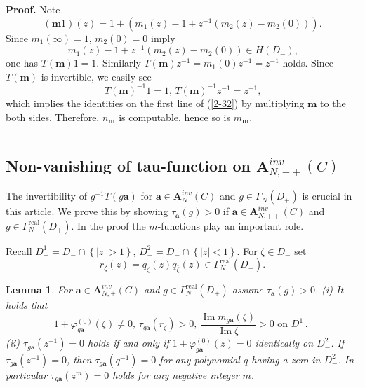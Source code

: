 \documentclass[a4paper]{article}%
\newtheorem{lemma}{Lemma}
\newenvironment{proof}[1][Proof]{\noindent\textbf{#1.} }{\ \rule{0.5em}{0.5em}}
\begin{document}
\begin{proof}
Note%
\[
\left(  \boldsymbol{m}1\right)  \left(  z\right)  =1+\left(  m_{1}\left(
z\right)  -1+z^{-1}\left(  m_{2}\left(  z\right)  -m_{2}\left(  0\right)
\right)  \right)  \text{.}%
\]
Since $m_{1}(\infty)=1$, $m_{2}(0)=0$ imply%
\[
m_{1}\left(  z\right)  -1+z^{-1}\left(  m_{2}\left(  z\right)  -m_{2}\left(
0\right)  \right)  \in H\left(  D_{-}\right)  \text{,}%
\]
one has $T\left(  \boldsymbol{m}\right)  1=1$. Similarly $T\left(
\boldsymbol{m}\right)  z^{-1}=m_{1}\left(  0\right)  z^{-1}=z^{-1}$ holds.
Since $T\left(  \boldsymbol{m}\right)  $ is invertible, we easily see%
\[
T\left(  \boldsymbol{m}\right)  ^{-1}1=1\text{, \ \ }T\left(  \boldsymbol{m}%
\right)  ^{-1}z^{-1}=z^{-1}\text{,}%
\]
which implies the identities on the first line of (\ref{2-32}) by multiplying
$\boldsymbol{m}$ to the both sides. Therefore, $n_{\boldsymbol{m}}$ is
computable, hence so is $m_{\boldsymbol{m}}$.
\end{proof}

\subsection{Non-vanishing of tau-function on $\boldsymbol{A}_{N,++}%
^{inv}\left(  C\right)  $}

The invertibility of $g^{-1}T\left(  g\boldsymbol{a}\right)  $ for
$\boldsymbol{a}\in\boldsymbol{A}_{N}^{inv}\left(  C\right)  $ and $g\in
\Gamma_{N}\left(  D_{+}\right)  $ is crucial in this article. We prove this by
showing $\tau_{\boldsymbol{a}}\left(  g\right)  >0$ if $\boldsymbol{a}%
\in\boldsymbol{A}_{N,++}^{inv}\left(  C\right)  $ and $g\in\Gamma
_{N}^{\operatorname{real}}\left(  D_{+}\right)  $. In the proof the
$m$-functions play an important role.

Recall $D_{-}^{1}=D_{-}\cap\left\{  \left\vert z\right\vert >1\right\}  $,
$D_{-}^{2}=D_{-}\cap\left\{  \left\vert z\right\vert <1\right\}  $. For
$\zeta\in D_{-}$ set
\[
r_{\zeta}\left(  z\right)  =q_{\zeta}\left(  z\right)  q_{\overline{\zeta}%
}\left(  z\right)  \in\Gamma_{N}^{\operatorname{real}}\left(  D_{+}\right)
\text{.}%
\]


\begin{lemma}
\label{l2-14}For $\boldsymbol{a}\in\boldsymbol{A}_{N,+}^{inv}\left(  C\right)
$ and $g\in\Gamma_{N}^{\operatorname{real}}\left(  D_{+}\right)  $ assume
$\tau_{\boldsymbol{a}}\left(  g\right)  >0$. \newline(i) It holds that%
\[
1+\varphi_{g\boldsymbol{a}}^{\left(  0\right)  }\left(  \zeta\right)
\neq0\text{, \ }\tau_{g\boldsymbol{a}}\left(  r_{\zeta}\right)  >0\text{,\ \ }%
\dfrac{\operatorname{Im}m_{g\boldsymbol{a}}\left(  \zeta\right)
}{\operatorname{Im}\zeta}>0\text{\ on }D_{-}^{1}\text{.\ }%
\]
\newline(ii) $\tau_{g\boldsymbol{a}}\left(  z^{-1}\right)  =0$ holds if and
only if $1+\varphi_{g\boldsymbol{a}}^{\left(  0\right)  }\left(  z\right)  =0$
identically on $D_{-}^{2}$. If $\tau_{g\boldsymbol{a}}\left(  z^{-1}\right)
=0$, then $\tau_{g\boldsymbol{a}}\left(  q^{-1}\right)  =0$ for any polynomial
$q$ having a zero in $D_{-}^{2}$. In particular $\tau_{g\boldsymbol{a}}\left(
z^{m}\right)  =0$ holds for any negative integer $m$.
\end{lemma}
\end{document}

